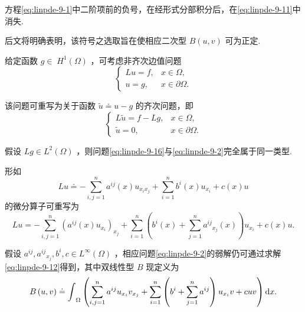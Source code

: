 \begin{remark}\label{rem:linpde-9-4}
方程\eqref{eq:linpde-9-1}中二阶项前的负号，在经形式分部积分后，在\eqref{eq:linpde-9-11}中消失.

后文将明确表明，该符号之选取旨在使相应二次型 $B\left(  {u,v}\right)$ 可为正定.
\end{remark}

\begin{remark}\label{rem:linpde-9-5}
给定函数 $g \in \; {H}^{1}\left( \Omega \right)$ ，可考虑非齐次边值问题
\begin{equation}\tag{9.15}\label{eq:linpde-9-15}
\begin{cases} {Lu} = f,  & x \in  \Omega , \\  u = g, & x \in  \partial \Omega . \end{cases}
\end{equation}

该问题可重写为关于函数 $\widetilde{u} \doteq  u - g$ 的齐次问题，即
\begin{equation}\tag{9.16}\label{eq:linpde-9-16}
\begin{cases} L\widetilde{u} = f - {Lg}, & x \in  \Omega , \\  \widetilde{u} = 0, & x \in  \partial \Omega . \end{cases}
\end{equation}

假设 ${Lg} \in  {L}^{2}\left( \Omega \right)$ ，则问题\eqref{eq:linpde-9-16}与\eqref{eq:linpde-9-2}完全属于同一类型.
\end{remark}

\begin{remark}\label{rem:linpde-9-6}
形如
\[
{Lu} \doteq   - \sum_{{i,j = 1}}^{n}{a}^{ij}\left( x\right) {u}_{{x}_{i}{x}_{j}} + \sum_{{i = 1}}^{n}{b}^{i}\left( x\right) {u}_{{x}_{i}} + c\left( x\right) u
\]
的微分算子可重写为
\[
{Lu} =  - \sum_{{i,j = 1}}^{n}{\left( {a}^{ij}\left( x\right) {u}_{{x}_{i}}\right) }_{{x}_{j}} + \sum_{{i = 1}}^{n}\left( {{b}^{i}\left( x\right)  + \sum_{{j = 1}}^{n}{a}^{ij}{}_{{x}_{j}}\left( x\right) }\right) {u}_{{x}_{i}} + c\left( x\right) u.
\]

假设 ${a}^{ij},{a}^{ij}{}_{{x}_{j}},{b}^{i},c \in  {L}^{\infty }\left( \Omega \right)$ ，相应问题\eqref{eq:linpde-9-2}的弱解仍可通过求解\eqref{eq:linpde-9-12}得到，其中双线性型 $B$ 现定义为
\[
B\left(  {u,v}\right)   \doteq  {\int }_{\Omega }\left( {\sum_{{i,j = 1}}^{n}{a}^{ij}{u}_{{x}_{i}}{v}_{{x}_{j}} + \sum_{{i = 1}}^{n}\left( {{b}^{i} + \sum_{{j = 1}}^{n}{a}^{ij}}\right) {u}_{{x}_{i}}v + {cuv}}\right) {\mathop{}\!\mathrm{d} x}.
\]
\end{remark}

